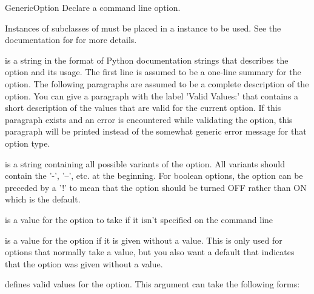 \documentclass{manual}
\begin{document}
\begin{classdesc}{GenericOption}{
}
Declare a command line option.

Instances of subclasses of  must be placed in
a  instance to be used.  See the documentation for
 for more details.

 is a string in the format of Python documentation
   strings that describes the option and its usage.  The first
   line is assumed to be a one-line summary for the option.
   The following paragraphs are assumed to be a complete description
   of the option.  You can give a paragraph with the label
   'Valid Values:' that contains a short description of the
   values that are valid for the current option.  If this
   paragraph exists and an error is encountered while validating
   the option, this paragraph will be printed instead of the
   somewhat generic error message for that option type.

 is a string containing all possible variants of the
   option.  All variants should contain the '-', '--', etc. at
   the beginning.  For boolean options, the option can be preceded
   by a '!' to mean that the option should be turned OFF rather
   than ON which is the default.

 is a value for the option to take if it isn't specified
   on the command line

 is a value for the option if it is given without a value.
   This is only used for options that normally take a value,
   but you also want a default that indicates that the option
   was given without a value.

 defines valid values for the option.  This argument can take
   the following forms:
        


\end{classdesc}
\end{document}
